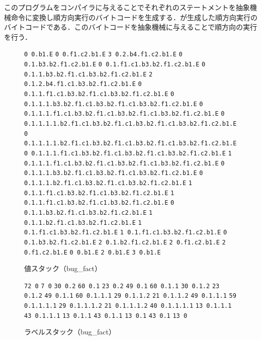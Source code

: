 \documentclass[submit,PRO]{ipsj}
\def\|{\verb|}
\begin{document}
このプログラムをコンパイラに与えることでそれぞれのステートメントを抽象機械命令に変換し順方向実行のバイトコードを生成する．が生成した順方向実行のバイトコードである．このバイトコードを抽象機械に与えることで順方向の実行を行う．

\begin{figure}[tb]
\vbox{
\hbox{\|0 0.b1.E|}
\hbox{\|0 0.f1.c2.b1.E|}
\hbox{\|3 0.2.b4.f1.c2.b1.E|}
\hbox{\|0 0.1.b3.b2.f1.c2.b1.E|}
\hbox{\|0 0.1.f1.c1.b3.b2.f1.c2.b1.E|}
\hbox{\|0 0.1.1.b3.b2.f1.c1.b3.b2.f1.c2.b1.E|}
\hbox{\|2 0.1.2.b4.f1.c1.b3.b2.f1.c2.b1.E|}
\hbox{\|0 0.1.1.f1.c1.b3.b2.f1.c1.b3.b2.f1.c2.b1.E|}
\hbox{\|0 0.1.1.1.b3.b2.f1.c1.b3.b2.f1.c1.b3.b2.f1.c2.b1.E|}
\hbox{\|0 0.1.1.1.f1.c1.b3.b2.f1.c1.b3.b2.f1.c1.b3.b2.f1.c2.b1.E|}
\hbox{\|0 0.1.1.1.1.b2.f1.c1.b3.b2.f1.c1.b3.b2.f1.c1.b3.b2.f1.c2.b1.E|}
\hbox{\|0 0.1.1.1.1.b2.f1.c1.b3.b2.f1.c1.b3.b2.f1.c1.b3.b2.f1.c2.b1.E|}
\hbox{\|0 0.1.1.1.f1.c1.b3.b2.f1.c1.b3.b2.f1.c1.b3.b2.f1.c2.b1.E|}
\hbox{\|1 0.1.1.1.f1.c1.b3.b2.f1.c1.b3.b2.f1.c1.b3.b2.f1.c2.b1.E|}
\hbox{\|0 0.1.1.1.b3.b2.f1.c1.b3.b2.f1.c1.b3.b2.f1.c2.b1.E|}
\hbox{\|0 0.1.1.1.b2.f1.c1.b3.b2.f1.c1.b3.b2.f1.c2.b1.E|}
\hbox{\|1 0.1.1.f1.c1.b3.b2.f1.c1.b3.b2.f1.c2.b1.E|}
\hbox{\|1 0.1.1.f1.c1.b3.b2.f1.c1.b3.b2.f1.c2.b1.E|}
\hbox{\|0 0.1.1.b3.b2.f1.c1.b3.b2.f1.c2.b1.E|}
\hbox{\|1 0.1.1.b2.f1.c1.b3.b2.f1.c2.b1.E|}
\hbox{\|1 0.1.f1.c1.b3.b2.f1.c2.b1.E|}
\hbox{\|1 0.1.f1.c1.b3.b2.f1.c2.b1.E|}
\hbox{\|0 0.1.b3.b2.f1.c2.b1.E|}
\hbox{\|2 0.1.b2.f1.c2.b1.E|}
\hbox{\|2 0.f1.c2.b1.E|}
\hbox{\|2 0.f1.c2.b1.E|}
\hbox{\|0 0.b1.E|}
\hbox{\|2 0.b1.E|}
\hbox{\|3 0.b1.E|}
}
\centerline{}
\caption{値スタック（bug\_fact）}
\label{fig:value}
\end{figure}

\begin{figure}[tb]
\vbox{
\hbox{\|72 0|}
\hbox{\|7 0|}
\hbox{\|30 0.2|}
\hbox{\|60 0.1|}
\hbox{\|23 0.2|}
\hbox{\|49 0.1|}
\hbox{\|60 0.1.1|}
\hbox{\|30 0.1.2|}
\hbox{\|23 0.1.2|}
\hbox{\|49 0.1.1|}
\hbox{\|60 0.1.1.1|}
\hbox{\|29 0.1.1.2|}
\hbox{\|21 0.1.1.2|}
\hbox{\|49 0.1.1.1|}
\hbox{\|59 0.1.1.1.1|}
\hbox{\|29 0.1.1.1.2|}
\hbox{\|21 0.1.1.1.2|}
\hbox{\|40 0.1.1.1.1|}
\hbox{\|13 0.1.1.1|}
\hbox{\|43 0.1.1.1|}
\hbox{\|13 0.1.1|}
\hbox{\|43 0.1.1|}
\hbox{\|13 0.1|}
\hbox{\|43 0.1|}
\hbox{\|13 0|}
}
\centerline{}
\caption{ラベルスタック（bug\_fact）}
\label{fig:label}
\end{figure}
\end{document}
